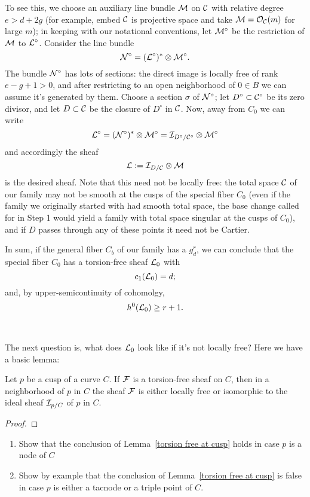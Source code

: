 To see this, we choose an auxiliary line bundle ${\mathcal M}$ on $\mathcal C$ with relative degree $e > d + 2g$ (for example, embed $\mathcal C$ is projective space and take ${\mathcal M} = {\mathcal O}_{\mathcal C}(m)$ for large $m$); in keeping with our notational conventions, let ${\mathcal M}^\circ$ be the restriction of ${\mathcal M}$ to ${\mathcal L}^\circ$. Consider the line bundle 
$$
{\mathcal N}^\circ = ({\mathcal L}^\circ)^* \otimes {\mathcal M}^\circ.
$$
The bundle ${\mathcal N}^\circ$ has lots of sections: the direct image is locally free of rank $e-g+1 > 0$, and after restricting to an open neighborhood of $0 \in B$ we can assume it's generated by them. Choose a section $\sigma$ of ${\mathcal N}^\circ$; let $D^\circ \subset \mathcal C^\circ$ be its zero divisor, and let $D \subset \mathcal C$ be the closure of $D^\circ$ in $\mathcal C$. Now, away from $C_0$ we can write
$$
{\mathcal L}^\circ = ({\mathcal N}^\circ)^* \otimes {\mathcal M}^\circ = {\mathcal I}_{D^\circ/\mathcal C^\circ} \otimes {\mathcal M}^\circ
$$
and accordingly the sheaf
$$
{\mathcal L} := {\mathcal I}_{D/\mathcal C} \otimes {\mathcal M}
$$
is the desired sheaf. Note that this need not be locally free: the total space $\mathcal C$ of our family may not be smooth at the cusps of the special fiber $C_0$ (even if the family we originally started with had smooth total space, the base change called for in Step 1 would yield a family with  total space singular at the cusps of $C_0$), and if $D$ passes through any of these points it need not be Cartier.

In sum, if the general fiber $C_b$ of our family has a $g^r_d$, we can conclude that the special fiber $C_0$ has a torsion-free sheaf ${\mathcal L}_0$ with 
$$
c_1({\mathcal L}_0) = d;
$$
and, by upper-semicontinuity of cohomolgy,
$$
h^0({\mathcal L}_0) \geq r+1.
$$

\


The next question is, what does ${\mathcal L}_0$ look like if it's not locally free? Here we have a basic lemma:

\begin{lemma}\label{torsion free at cusp}
Let $p$ be a  cusp of a curve $C$. If ${\mathcal F}$ is a torsion-free sheaf on $C$, then in a neighborhood of $p$ in $C$ the sheaf ${\mathcal F}$ is either locally free or isomorphic to the ideal sheaf ${\mathcal I}_{p/C}$ of $p$ in $C$.
\end{lemma}

\begin{proof}

\end{proof}

\begin{exercise}
\begin{enumerate}
\item Show  that the conclusion of Lemma~\ref{torsion free at cusp} holds in case $p$ is a node of $C$
\item Show by example that the conclusion of Lemma~\ref{torsion free at cusp} is false in case $p$ is either a tacnode or a triple point of $C$.
\end{enumerate}
\end{exercise}


